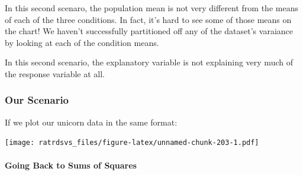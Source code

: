\documentclass[
]{book}
\newenvironment{Shaded}{\begin{snugshade}}{\end{snugshade}}
\newcommand{\DataTypeTok}[1]{\textcolor[rgb]{0.13,0.29,0.53}{#1}}
\newcommand{\DecValTok}[1]{\textcolor[rgb]{0.00,0.00,0.81}{#1}}
\newcommand{\KeywordTok}[1]{\textcolor[rgb]{0.13,0.29,0.53}{\textbf{#1}}}
\newcommand{\NormalTok}[1]{#1}
\newcommand{\OperatorTok}[1]{\textcolor[rgb]{0.81,0.36,0.00}{\textbf{#1}}}
\newcommand{\StringTok}[1]{\textcolor[rgb]{0.31,0.60,0.02}{#1}}
\let\oldparagraph\paragraph
\renewcommand{\paragraph}[1]{\oldparagraph{#1}\mbox{}}
\begin{document}
In this second scenaro, the population mean is not very different from the means of each of the three conditions. In fact, it's hard to see some of those means on the chart! We haven't successfully partitioned off any of the dataset's varaiance by looking at each of the condition means.

In this second scenario, the explanatory variable is not explaining very much of the response variable at all.

\hypertarget{our-scenario}{%
\subsubsection{Our Scenario}\label{our-scenario}}

If we plot our unicorn data in the same format:

\begin{Shaded}
\end{Shaded}

\texttt{[image: ratrdsvs\_files/figure-latex/unnamed-chunk-203-1.pdf]}

\hypertarget{going-back-to-sums-of-squares}{%
\paragraph{Going Back to Sums of Squares}\label{going-back-to-sums-of-squares}}
\end{document}

